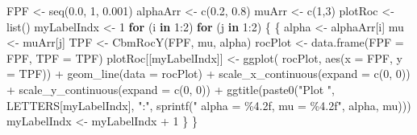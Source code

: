 \documentclass[
]{book}
\newenvironment{Shaded}{\begin{snugshade}}{\end{snugshade}}
\newcommand{\AttributeTok}[1]{\textcolor[rgb]{0.77,0.63,0.00}{#1}}
\newcommand{\ControlFlowTok}[1]{\textcolor[rgb]{0.13,0.29,0.53}{\textbf{#1}}}
\newcommand{\DecValTok}[1]{\textcolor[rgb]{0.00,0.00,0.81}{#1}}
\newcommand{\FloatTok}[1]{\textcolor[rgb]{0.00,0.00,0.81}{#1}}
\newcommand{\FunctionTok}[1]{\textcolor[rgb]{0.00,0.00,0.00}{#1}}
\newcommand{\NormalTok}[1]{#1}
\newcommand{\OtherTok}[1]{\textcolor[rgb]{0.56,0.35,0.01}{#1}}
\newcommand{\SpecialCharTok}[1]{\textcolor[rgb]{0.00,0.00,0.00}{#1}}
\newcommand{\StringTok}[1]{\textcolor[rgb]{0.31,0.60,0.02}{#1}}
\begin{document}
\begin{Shaded}
\begin{Highlighting}[]
\NormalTok{FPF }\OtherTok{\textless{}{-}} \FunctionTok{seq}\NormalTok{(}\FloatTok{0.0}\NormalTok{, }\DecValTok{1}\NormalTok{, }\FloatTok{0.001}\NormalTok{)}
\NormalTok{alphaArr }\OtherTok{\textless{}{-}} \FunctionTok{c}\NormalTok{(}\FloatTok{0.2}\NormalTok{, }\FloatTok{0.8}\NormalTok{)}
\NormalTok{muArr }\OtherTok{\textless{}{-}} \FunctionTok{c}\NormalTok{(}\DecValTok{1}\NormalTok{,}\DecValTok{3}\NormalTok{)}
\NormalTok{plotRoc }\OtherTok{\textless{}{-}} \FunctionTok{list}\NormalTok{()}
\NormalTok{myLabelIndx }\OtherTok{\textless{}{-}} \DecValTok{1}
\ControlFlowTok{for}\NormalTok{ (i }\ControlFlowTok{in} \DecValTok{1}\SpecialCharTok{:}\DecValTok{2}\NormalTok{)}
  \ControlFlowTok{for}\NormalTok{ (j }\ControlFlowTok{in} \DecValTok{1}\SpecialCharTok{:}\DecValTok{2}\NormalTok{) }
\NormalTok{  \{}
\NormalTok{    \{}
\NormalTok{      alpha }\OtherTok{\textless{}{-}}\NormalTok{ alphaArr[i]}
\NormalTok{      mu }\OtherTok{\textless{}{-}}\NormalTok{ muArr[j]}
\NormalTok{      TPF }\OtherTok{\textless{}{-}} \FunctionTok{CbmRocY}\NormalTok{(FPF, mu, alpha)}
\NormalTok{      rocPlot }\OtherTok{\textless{}{-}} \FunctionTok{data.frame}\NormalTok{(}\AttributeTok{FPF =}\NormalTok{ FPF, }\AttributeTok{TPF =}\NormalTok{ TPF)}
\NormalTok{      plotRoc[[myLabelIndx]] }\OtherTok{\textless{}{-}} \FunctionTok{ggplot}\NormalTok{(}
\NormalTok{        rocPlot, }\FunctionTok{aes}\NormalTok{(}\AttributeTok{x =}\NormalTok{ FPF, }\AttributeTok{y =}\NormalTok{ TPF)) }\SpecialCharTok{+} 
        \FunctionTok{geom\_line}\NormalTok{(}\AttributeTok{data =}\NormalTok{ rocPlot) }\SpecialCharTok{+} 
        \FunctionTok{scale\_x\_continuous}\NormalTok{(}\AttributeTok{expand =} \FunctionTok{c}\NormalTok{(}\DecValTok{0}\NormalTok{, }\DecValTok{0}\NormalTok{)) }\SpecialCharTok{+} 
        \FunctionTok{scale\_y\_continuous}\NormalTok{(}\AttributeTok{expand =} \FunctionTok{c}\NormalTok{(}\DecValTok{0}\NormalTok{, }\DecValTok{0}\NormalTok{)) }\SpecialCharTok{+}
        \FunctionTok{ggtitle}\NormalTok{(}\FunctionTok{paste0}\NormalTok{(}\StringTok{"Plot "}\NormalTok{, }
\NormalTok{                   LETTERS[myLabelIndx], }
                   \StringTok{":"}\NormalTok{, }
                   \FunctionTok{sprintf}\NormalTok{(}\StringTok{" alpha = \%4.2f, mu = \%4.2f"}\NormalTok{, }
\NormalTok{                           alpha, mu)))}
\NormalTok{      myLabelIndx }\OtherTok{\textless{}{-}}\NormalTok{ myLabelIndx }\SpecialCharTok{+} \DecValTok{1}
\NormalTok{    \}}
\NormalTok{  \}}
\end{Highlighting}
\end{Shaded}
\end{document}
